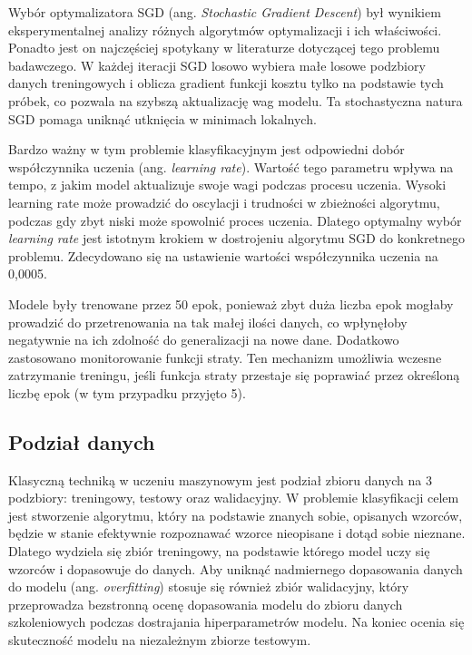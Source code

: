 Wybór optymalizatora SGD (ang. \emph{Stochastic Gradient Descent}) był wynikiem eksperymentalnej analizy różnych algorytmów optymalizacji i ich właściwości.
Ponadto jest on najczęściej spotykany w literaturze dotyczącej tego problemu badawczego.
W każdej iteracji SGD losowo wybiera małe losowe podzbiory danych treningowych i oblicza gradient funkcji kosztu tylko na podstawie tych próbek, co pozwala na szybszą aktualizację wag modelu.
Ta stochastyczna natura SGD pomaga uniknąć utknięcia w minimach lokalnych.

Bardzo ważny w tym problemie klasyfikacyjnym jest odpowiedni dobór współczynnika uczenia (ang. \emph{learning rate}).
Wartość tego parametru wpływa na tempo, z jakim model aktualizuje swoje wagi podczas procesu uczenia.
Wysoki learning rate może prowadzić do oscylacji i trudności w zbieżności algorytmu, podczas gdy zbyt niski może spowolnić proces uczenia.
Dlatego optymalny wybór \emph{learning rate} jest istotnym krokiem w dostrojeniu algorytmu SGD do konkretnego problemu.
Zdecydowano się na ustawienie wartości współczynnika uczenia na 0,0005.

Modele były trenowane przez 50 epok, ponieważ zbyt duża liczba epok mogłaby prowadzić do przetrenowania na tak małej ilości danych, co wpłynęłoby negatywnie na ich zdolność do generalizacji na nowe dane.
Dodatkowo zastosowano monitorowanie funkcji straty.
Ten mechanizm umożliwia wczesne zatrzymanie treningu, jeśli funkcja straty przestaje się poprawiać przez określoną liczbę epok (w tym przypadku przyjęto 5).

\subsection{Podział danych}
\label{subsec:podzial-danych}

Klasyczną techniką w uczeniu maszynowym jest podział zbioru danych na 3 podzbiory: treningowy, testowy oraz walidacyjny.
W problemie klasyfikacji celem jest stworzenie algorytmu, który na podstawie znanych sobie, opisanych wzorców, będzie w stanie efektywnie rozpoznawać wzorce nieopisane i dotąd sobie nieznane.
Dlatego wydziela się zbiór treningowy, na podstawie którego model uczy się wzorców i dopasowuje do danych.
Aby uniknąć nadmiernego dopasowania danych do modelu (ang.
\emph{overfitting}) stosuje się również zbiór walidacyjny, który  przeprowadza bezstronną ocenę dopasowania modelu do zbioru danych szkoleniowych podczas dostrajania hiperparametrów modelu.
Na koniec ocenia się skuteczność modelu na niezależnym zbiorze testowym.

